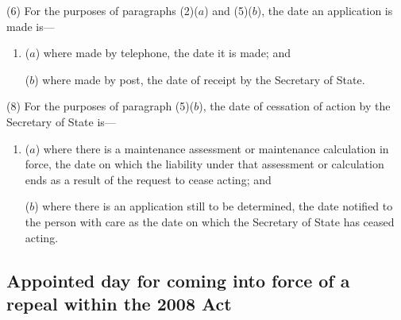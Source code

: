 \documentclass[12pt,a4paper]{article}
\begin{document}
(6) For the purposes of paragraphs (2)($a$)  and (5)($b$), the date an application is made is—
\begin{enumerate}\item[]
($a$) where made by telephone, the date it is made; and

($b$) where made by post, the date of receipt by the Secretary of State.
\end{enumerate}

%

(8) For the purposes of paragraph (5)($b$), the date of cessation of action by the Secretary of State is—
\begin{enumerate}\item[]
($a$) where there is a maintenance assessment or maintenance calculation in force, the date on which the liability under that assessment or calculation ends as a result of the request to cease acting; and

($b$) where there is an application still to be determined, the date notified to the person with care as the date on which the Secretary of State has ceased acting.
\end{enumerate}


\subsection[4. Appointed day for coming into force of a repeal within the 2008 Act]{Appointed day for coming into force of a repeal within the 2008 Act}
\end{document}
